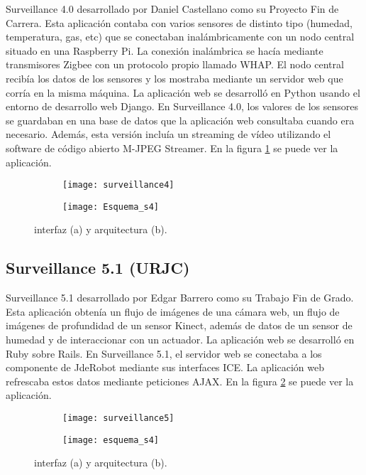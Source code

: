 Surveillance 4.0 desarrollado por Daniel Castellano como su Proyecto Fin de Carrera. Esta aplicación contaba con varios sensores de distinto tipo (humedad, temperatura, gas, etc) que se conectaban inalámbricamente con un nodo central situado en una Raspberry Pi. La conexión inalámbrica se hacía mediante transmisores Zigbee con un protocolo propio llamado WHAP. El nodo central recibía los datos de los sensores y los mostraba mediante un servidor web que corría en la misma máquina. La aplicación web se desarrolló en Python usando el entorno de desarrollo web Django. En Surveillance 4.0, los valores de los sensores se guardaban en una base de datos que la aplicación web consultaba cuando era necesario. Además, esta versión incluía un streaming de vídeo utilizando el software de código abierto M-JPEG Streamer. En la figura \ref{fig:surveillance4} se puede ver la aplicación.\\

\begin{figure}[h]
\centering
  \begin{subfigure}[]{110mm}
    \texttt{[image: surveillance4]}
  \end{subfigure}
  \hspace{5pt}
  \begin{subfigure}[]{110mm}
    \texttt{[image: Esquema\_s4]}
  \end{subfigure}
  \caption{interfaz (a) y arquitectura (b).}\label{fig:surveillance4}
\end{figure}



\subsection{Surveillance 5.1 (URJC)}

Surveillance 5.1 desarrollado por Edgar Barrero como su Trabajo Fin de Grado. Esta aplicación obtenía un flujo de imágenes de una cámara web, un flujo de imágenes de profundidad de un sensor Kinect, además de datos de un sensor de humedad y de interaccionar con un actuador. La aplicación web se desarrolló en Ruby sobre Rails. En Surveillance 5.1, el servidor web se conectaba a los componente de JdeRobot mediante sus interfaces ICE. La aplicación web refrescaba estos datos mediante peticiones AJAX.  En la figura \ref{fig:surveillance5} se puede ver la aplicación.\\


\begin{figure}[h]
\centering
  \begin{subfigure}[]{110mm}
    \texttt{[image: surveillance5]}
  \end{subfigure}
  \hspace{5pt}
  \begin{subfigure}[]{110mm}
    \texttt{[image: esquema\_s4]}
  \end{subfigure}
  \caption{interfaz (a) y arquitectura (b).}\label{fig:surveillance5}
\end{figure}


